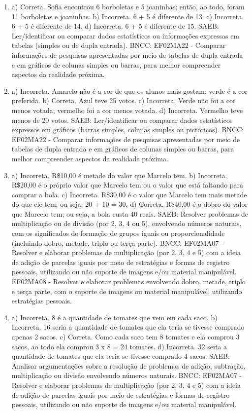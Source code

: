 \begin{enumerate}
\item
a) Correta. Sofia encontrou 6 borboletas e 5 joaninhas; então, ao todo, foram 11 borboletas e joaninhas.
b) Incorreta. 6 + 5 é diferente de 13.
c) Incorreta. 6 + 5 é diferente de 14.
d) Incorreta. 6 + 5 é diferente de 15.
SAEB: Ler/identificar ou comparar dados estatísticos ou
informações expressas em tabelas (simples ou de dupla entrada).
BNCC: EF02MA22 - Comparar informações de pesquisas apresentadas por meio
de tabelas de dupla entrada e em gráficos de colunas simples ou barras,
para melhor compreender aspectos da realidade próxima.

\item
a) Incorreta. Amarelo não é a cor de que os alunos mais gostam; verde é a cor preferida.
b) Correta. Azul teve 25 votos.
c) Incorreta. Verde não foi a cor menos votada; vermelho foi a cor menos votada.
d) Incorreta. Vermelho teve menos de 20 votos.
SAEB: Ler/identificar ou comparar dados estatísticos expressos
em gráficos (barras simples, colunas simples ou pictóricos).
BNCC: EF02MA22 - Comparar informações de pesquisas apresentadas por meio
de tabelas de dupla entrada e em gráficos de colunas simples ou barras,
para melhor compreender aspectos da realidade próxima.

\item
a) Incorreta. R\$10,00 é metade do valor que Marcelo tem.
b) Incorreta. R\$20,00 é o próprio valor que Marcelo tem ou o valor que
está faltando para comprar a bola.
c) Incorreta. R\$30,00 é o valor que Marcelo tem mais metade do que ele
tem; ou seja, 20 + 10 = 30.
d) Correta. R\$40,00 é o dobro do valor que Marcelo tem; ou seja, a bola
custa 40 reais.
SAEB: Resolver problemas de multiplicação ou de divisão (por 2,
3, 4 ou 5), envolvendo números naturais, com os significados de formação
de grupos iguais ou proporcionalidade (incluindo dobro, metade, triplo
ou terça parte).
BNCC: EF02MA07 - Resolver e elaborar problemas de multiplicação (por 2,
3, 4 e 5) com a ideia de adição de parcelas iguais por meio de
estratégias e formas de registro pessoais, utilizando ou não suporte de
imagens e/ou material manipulável. EF02MA08 - Resolver e elaborar
problemas envolvendo dobro, metade, triplo e terça parte, com o suporte
de imagens ou material manipulável, utilizando estratégias pessoais.

\item
a) Incorreta. 8 é a quantidade de tomates que vem em cada saco.
b) Incorreta. 16 seria a quantidade de tomates que ela teria se tivesse comprado apenas 2 sacos.
c) Correta. Como cada saco tem 8 tomates e ela comprou 3 sacos, ao todo ela comprou 3 x 8 = 24 tomates.
d) Incorreta. 32 seria a quantidade de tomates que ela teria se tivesse comprado 4 sacos.
SAEB: Analisar argumentações sobre a resolução de problemas de
adição, subtração, multiplicação ou divisão envolvendo números naturais.
BNCC: EF02MA07 - Resolver e elaborar problemas de multiplicação (por 2,
3, 4 e 5) com a ideia de adição de parcelas iguais por meio de
estratégias e formas de registro pessoais, utilizando ou não suporte de
imagens e/ou material manipulável.
\end{enumerate}


